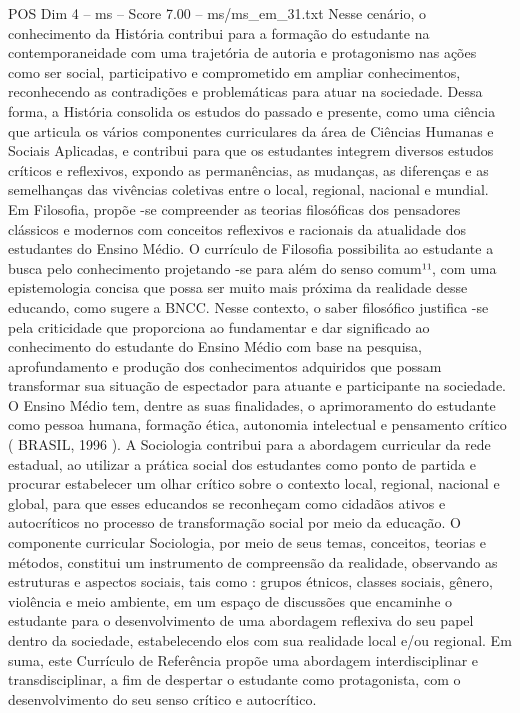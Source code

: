 \begin{textsample}{POS Dim 4 – ms – Score 7.00 – ms/ms\_em\_31.txt}
Nesse cenário, o conhecimento da História contribui para a formação do estudante na contemporaneidade com uma trajetória de autoria e protagonismo nas ações como ser social, participativo e comprometido em ampliar conhecimentos, reconhecendo as contradições e problemáticas para atuar na sociedade.
Dessa forma, a História consolida os estudos do passado e presente, como uma ciência que articula os vários componentes curriculares da área de Ciências Humanas e Sociais Aplicadas, e contribui para que os estudantes integrem diversos estudos críticos e reflexivos, expondo as permanências, as mudanças, as diferenças e as semelhanças das vivências coletivas entre o local, regional, nacional e mundial.
Em Filosofia, propõe -se compreender as teorias filosóficas dos pensadores clássicos e modernos com conceitos reflexivos e racionais da atualidade dos estudantes do Ensino Médio.
O currículo de Filosofia possibilita ao estudante a busca pelo conhecimento projetando -se para além do senso comum¹¹, com uma epistemologia concisa que possa ser muito mais próxima da realidade desse educando, como sugere a BNCC.
Nesse contexto, o saber filosófico justifica -se pela criticidade que proporciona ao fundamentar e dar significado ao conhecimento do estudante do Ensino Médio com base na pesquisa, aprofundamento e produção dos conhecimentos adquiridos que possam transformar sua situação de espectador para atuante e participante na sociedade.
O Ensino Médio tem, dentre as suas finalidades, o aprimoramento do estudante como pessoa humana, formação ética, autonomia intelectual e pensamento crítico ( BRASIL, 1996 ).
A Sociologia contribui para a abordagem curricular da rede estadual, ao utilizar a prática social dos estudantes como ponto de partida e procurar estabelecer um olhar crítico sobre o contexto local, regional, nacional e global, para que esses educandos se reconheçam como cidadãos ativos e autocríticos no processo de transformação social por meio da educação.
O componente curricular Sociologia, por meio de seus temas, conceitos, teorias e métodos, constitui um instrumento de compreensão da realidade, observando as estruturas e aspectos sociais, tais como : grupos étnicos, classes sociais, gênero, violência e meio ambiente, em um espaço de discussões que encaminhe o estudante para o desenvolvimento de uma abordagem reflexiva do seu papel dentro da sociedade, estabelecendo elos com sua realidade local e/ou regional.
Em suma, este Currículo de Referência propõe uma abordagem interdisciplinar e transdisciplinar, a fim de despertar o estudante como protagonista, com o desenvolvimento do seu senso crítico e autocrítico.

\end{textsample}
